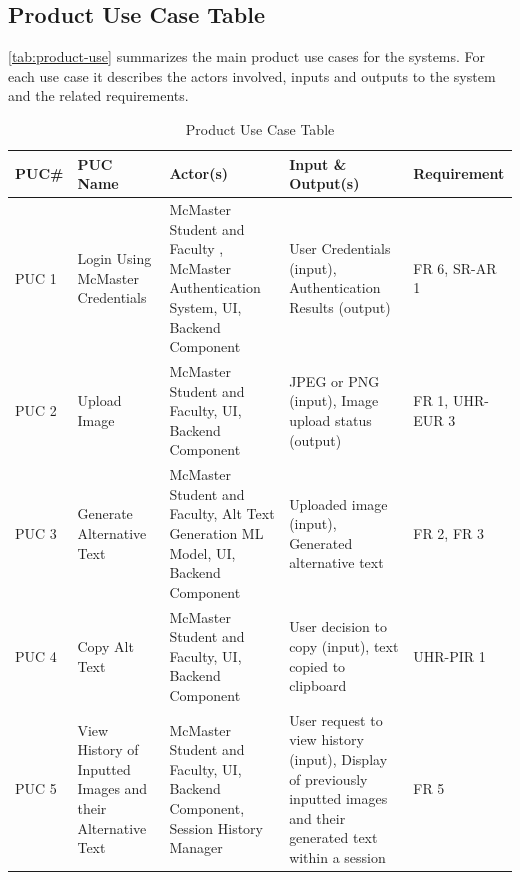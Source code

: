 \documentclass[12pt]{article}
\begin{document}
\subsection{Product Use Case Table}
\autoref{tab:product-use} summarizes the main product use cases
for the systems. For each use case it describes the actors involved,
inputs and outputs to the system and the related requirements.
\begin{table}[H]
  \centering
  \caption{Product Use Case Table}
  \label{tab:product-use}
  \begin{tabular}{p{1.3cm}|p{2.5cm}|p{3.5cm}|p{4cm}|p{2.6cm}}
    \midrule
    \textbf{PUC\#} & \textbf{PUC Name} & \textbf{Actor(s)} &
    \textbf{Input \& Output(s)} & \textbf{Requirement} \\
    \midrule
    PUC 1 & Login Using McMaster Credentials &  McMaster Student and
    Faculty , McMaster Authentication System, UI, Backend Component & User Credentials
    (input), Authentication Results (output) & FR 6, SR-AR 1\\
    \midrule
    PUC 2 & Upload Image & McMaster Student and Faculty, UI, Backend Component & JPEG or PNG
    (input), Image upload status (output) & FR 1, UHR-EUR 3 \\
    \midrule
    PUC 3 & Generate Alternative Text &  McMaster Student and
    Faculty, Alt Text Generation ML Model, UI, Backend Component & Uploaded image
    (input), Generated alternative text  & FR 2, FR 3\\
    \midrule
    PUC 4 & Copy Alt Text & McMaster Student and Faculty, UI, Backend Component &
    User decision to copy (input), text copied to
    clipboard & UHR-PIR 1\\
    \midrule
    PUC 5 & View History of Inputted Images and their Alternative
    Text& McMaster Student and Faculty, UI, Backend Component, Session History Manager & User request to view
    history (input), Display of previously inputted images and their
    generated text within a session & FR 5\\
    \midrule
  \end{tabular}
\end{table}
\end{document}
